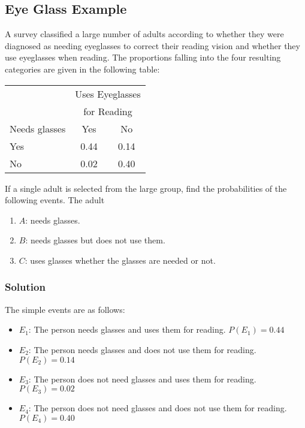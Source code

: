 \documentclass[11pt]{article}
\theoremstyle{definition}
\begin{document}
\subsection{Eye Glass Example}

A survey classified a large number of adults according to whether they were diagnosed as needing eyeglasses to correct their reading vision and whether they use eyeglasses when reading. The proportions falling into the four resulting categories are given in the following table:

\begin{table}[H]
	\centering
	\begin{tabular}{lcc}
		\hline
		& \multicolumn{2}{c}{Uses Eyeglasses} \\
		& \multicolumn{2}{c}{for Reading} \\\cmidrule{2-3}
		Needs glasses & Yes & No \\\hline
		Yes & 0.44 & 0.14 \\
		No & 0.02 & 0.40 \\\hline
	\end{tabular}
\end{table}

\noindent If a single adult is selected from the large group, find the probabilities of the following events. The adult

\begin{enumerate}
	\item $A$: needs glasses.
	\item $B$: needs glasses but does not use them.
	\item $C$: uses glasses whether the glasses are needed or not.
\end{enumerate}

\subsubsection*{Solution}

The simple events are as follows:

\begin{itemize}
	\item $E_1$: The person needs glasses and uses them for reading. $P(E_1) = 0.44$
	\item $E_2$: The person needs glasses and does not use them for reading. $P(E_2) = 0.14$
	\item $E_3$: The person does not need glasses and uses them for reading. $P(E_3) = 0.02$
	\item $E_4$: The person does not need glasses and does not use them for  reading. $P(E_4) = 0.40$
\end{itemize}
\end{document}
